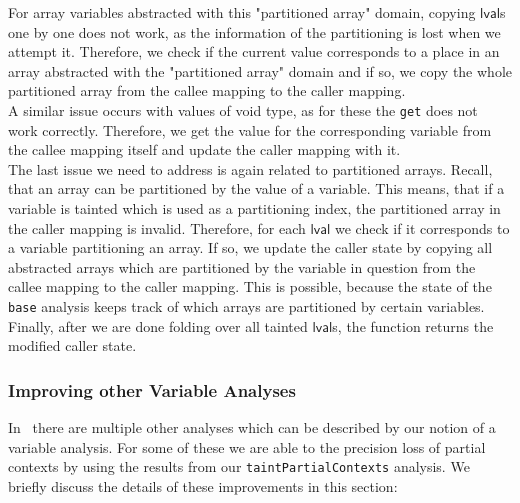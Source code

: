       For array variables abstracted with this "partitioned array" domain, copying $\textsf{lval}$s one by one does not work, as the information of the partitioning is lost when we attempt it. Therefore, we check if the current value corresponds to a place in an array abstracted with the "partitioned array" domain and if so, we copy the whole partitioned array from the callee mapping to the caller mapping.\\
      A similar issue occurs with values of void type, as for these the \texttt{get} does not work correctly. Therefore, we get the value for the corresponding variable from the callee mapping itself and update the caller mapping with it.\\
      The last issue we need to address is again related to partitioned arrays. Recall, that an array can be partitioned by the value of a variable. This means, that if a variable is tainted which is used as a partitioning index, the partitioned array in the caller mapping is invalid. Therefore, for each $\textsf{lval}$ we check if it corresponds to a variable partitioning an array. If so, we update the caller state by copying all abstracted arrays which are partitioned by the variable in question from the callee mapping to the caller mapping. This is possible, because the state of the \texttt{base} analysis keeps track of which arrays are partitioned by certain variables.\\
      Finally, after we are done folding over all tainted $\textsf{lval}$s, the function returns the modified caller state.

    \subsubsection{Improving other Variable Analyses}
      In \gob\ there are multiple other analyses which can be described by our notion of a variable analysis. For some of these we are able to the precision loss of partial contexts by using the results from our \texttt{taintPartialContexts} analysis. We briefly discuss the details of these improvements in this section:

